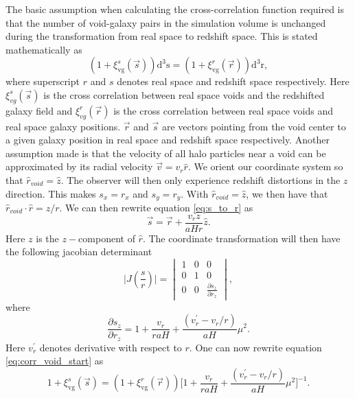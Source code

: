 The basic assumption when calculating the cross-correlation function
required is that the number of void-galaxy pairs in the simulation volume is
unchanged during the transformation from real space to redshift space. This is stated
mathematically as
\begin{equation}\label{eq:corr_void_start}
    (1 + \xi^s_{\mathrm{vg}}(\vec{s}))\mathrm{d}^3\mathrm{s}=(1 + \xi^r_{\mathrm{vg}}(\vec{r}))\mathrm{d}^3\mathrm{r},
\end{equation}
where superscript $r$ and $s$ denotes real space and redshift space respectively.
Here $\xi^s_{vg}(\vec{s})$ is the cross correlation between real space voids and
the redshifted galaxy field and $\xi^r_{vg}(\vec{r})$ is the cross correlation
between real space voids and real space galaxy positions. $\vec{r}$ and $\vec{s}$
are vectors pointing from the void center to a given galaxy position in
real space and redshift space respectively. Another assumption made
is that the velocity of all halo particles near a void can be approximated by
its radial velocity $\vec{v}=v_r \hat{r}$. We orient our coordinate system so that
$\hat{r}_{void}=\hat{z}$. The observer will then only experience redshift
distortions in the $z$ direction. This makes $s_x=r_x$ and $s_y=r_y$. With $\hat{r}_{void}=\hat{z}$, we then have that
$\hat{r}_{void}\cdot\hat{r}=z/r$. We can then rewrite equation \ref{eq:s_to_r}
as
\begin{equation}\label{eq:s_tp_r}
    \vec{s}=\vec{r}+\frac{v_rz}{aHr}\hat{z}.
\end{equation}
Here $z$ is the $z-$component of $\hat{r}$.
The coordinate transformation will then have the
following jacobian determinant
\begin{equation}
    \vert J(\frac{s}{r})\vert=
    \begin{vmatrix}
        1 & 0 & 0\\
        0 & 1 & 0\\
        0 & 0 & \frac{\partial s_z}{\partial r_z} 
    \end{vmatrix},
\end{equation}
where
\begin{equation}
    \frac{\partial s_z}{\partial r_z} = 1 + \frac{v_r}{raH}+\frac{(v_r^\prime-v_r/r)}{aH}\mu^2.
\end{equation}
Here $v_r^\prime$ denotes derivative with respect to $r$. One can now rewrite
equation \ref{eq:corr_void_start} as
\begin{equation}\label{eq:corr_temp}
    1 + \xi^s_{\mathrm{vg}}(\vec{s})=(1 + \xi^r_{\mathrm{vg}}(\vec{r})) \Big[1 + \frac{v_r}{raH}+\frac{(v_r^\prime-v_r/r)}{aH}\mu^2 \Big]^{-1}.
\end{equation}
